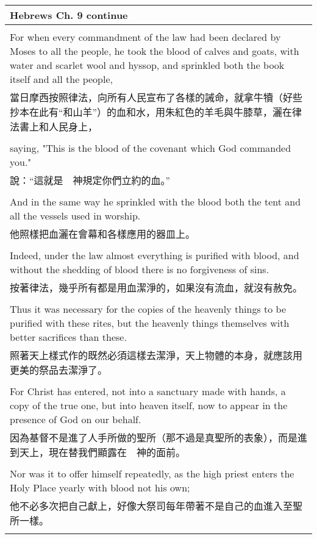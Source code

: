 \newpage
\begin{tabularx}{\textwidth}{p{}}
\hline
Hebrews Ch. 9 continue \\
\hline \\
For when every commandment of the law had been declared by Moses to all the people, he took the blood of calves and goats, with water and scarlet wool and hyssop, and sprinkled both the book itself and all the people, \\
當日摩西按照律法，向所有人民宣布了各樣的誡命，就拿牛犢（好些抄本在此有“和山羊”）的血和水，用朱紅色的羊毛與牛膝草，灑在律法書上和人民身上， \\ \\
saying, "This is the blood of the covenant which God commanded you." \\
說：“這就是　神規定你們立約的血。” \\ \\
And in the same way he sprinkled with the blood both the tent and all the vessels used in worship. \\
他照樣把血灑在會幕和各樣應用的器皿上。 \\ \\
Indeed, under the law almost everything is purified with blood, and without the shedding of blood there is no forgiveness of sins. \\
按著律法，幾乎所有都是用血潔淨的，如果沒有流血，就沒有赦免。 \\ \\
Thus it was necessary for the copies of the heavenly things to be purified with these rites, but the heavenly things themselves with better sacrifices than these. \\
照著天上樣式作的既然必須這樣去潔淨，天上物體的本身，就應該用更美的祭品去潔淨了。 \\ \\
For Christ has entered, not into a sanctuary made with hands, a copy of the true one, but into heaven itself, now to appear in the presence of God on our behalf. \\
因為基督不是進了人手所做的聖所（那不過是真聖所的表象），而是進到天上，現在替我們顯露在　神的面前。 \\ \\
Nor was it to offer himself repeatedly, as the high priest enters the Holy Place yearly with blood not his own; \\
他不必多次把自己獻上，好像大祭司每年帶著不是自己的血進入至聖所一樣。 \\ \\

\end{tabularx}
